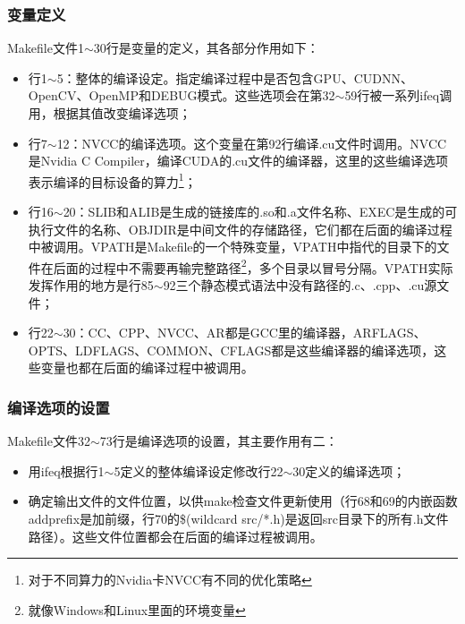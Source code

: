 \subsubsection{变量定义}
Makefile文件1$\sim$30行是变量的定义，其各部分作用如下：
\begin{itemize}
    \item 行1$\sim$5：整体的编译设定。指定编译过程中是否包含GPU、CUDNN、OpenCV、OpenMP和DEBUG模式。这些选项会在第32$\sim$59行被一系列ifeq调用，根据其值改变编译选项；
    \item 行7$\sim$12：NVCC的编译选项。这个变量在第92行编译.cu文件时调用。NVCC是Nvidia C Compiler，编译CUDA的.cu文件的编译器，这里的这些编译选项表示编译的目标设备的算力\footnote{对于不同算力的Nvidia卡NVCC有不同的优化策略}；
    \item 行16$\sim$20：SLIB和ALIB是生成的链接库的.so和.a文件名称、EXEC是生成的可执行文件的名称、OBJDIR是中间文件的存储路径，它们都在后面的编译过程中被调用。VPATH是Makefile的一个特殊变量，VPATH中指代的目录下的文件在后面的过程中不需要再输完整路径\footnote{就像Windows和Linux里面的环境变量}，多个目录以冒号分隔。VPATH实际发挥作用的地方是行85$\sim$92三个静态模式语法中没有路径的.c、.cpp、.cu源文件；
    \item 行22$\sim$30：CC、CPP、NVCC、AR都是GCC里的编译器，ARFLAGS、OPTS、LDFLAGS、COMMON、CFLAGS都是这些编译器的编译选项，这些变量也都在后面的编译过程中被调用。
\end{itemize}

\subsubsection{编译选项的设置}
Makefile文件32$\sim$73行是编译选项的设置，其主要作用有二：
\begin{itemize}
    \item 用ifeq根据行1$\sim$5定义的整体编译设定修改行22$\sim$30定义的编译选项；
    \item 确定输出文件的文件位置，以供make检查文件更新使用（行68和69的内嵌函数addprefix是加前缀，行70的\$(wildcard src/*.h)是返回src目录下的所有.h文件路径）。这些文件位置都会在后面的编译过程被调用。
\end{itemize}

